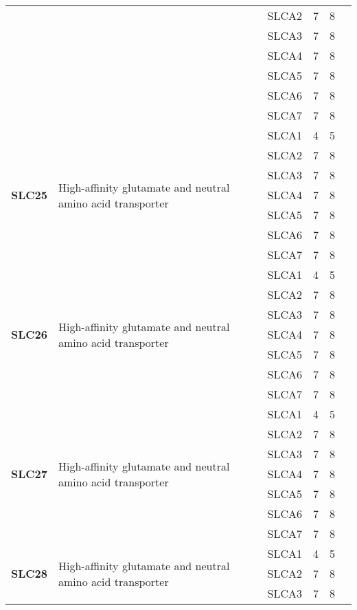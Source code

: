 \documentclass[12pt]{report}
\begin{document}
\begin{center}
\begin{longtable}{|p{1.5cm}|p{3.2cm}|p{1.9cm}|p{1.65cm}|p{3cm}|p{3cm}|}
\cline{3-6}
&&SLCA2&7 & 8&\\ 
\cline{3-6}
&&SLCA3&7 & 8&\\ 
\cline{3-6}
&&SLCA4&7 & 8&\\ 
\cline{3-6}
&&SLCA5&7 & 8&\\ 
\cline{3-6}
&&SLCA6&7 & 8&\\ 
\cline{3-6}
&&SLCA7&7 & 8&\\ 
\hline
\multirow{7}{1.5cm}{\textbf{SLC25}} & \multirow{7}{4cm}{High-affinity glutamate and neutral amino acid transporter} & SLCA1 & 4 & 5\\ 
\cline{3-6}
&&SLCA2&7 & 8&\\ 
\cline{3-6}
&&SLCA3&7 & 8&\\ 
\cline{3-6}
&&SLCA4&7 & 8&\\ 
\cline{3-6}
&&SLCA5&7 & 8&\\ 
\cline{3-6}
&&SLCA6&7 & 8&\\ 
\cline{3-6}
&&SLCA7&7 & 8&\\ 
\hline
\multirow{7}{1.5cm}{\textbf{SLC26}} & \multirow{7}{4cm}{High-affinity glutamate and neutral amino acid transporter} & SLCA1 & 4 & 5\\ 
\cline{3-6}
&&SLCA2&7 & 8&\\ 
\cline{3-6}
&&SLCA3&7 & 8&\\ 
\cline{3-6}
&&SLCA4&7 & 8&\\ 
\cline{3-6}
&&SLCA5&7 & 8&\\ 
\cline{3-6}
&&SLCA6&7 & 8&\\ 
\cline{3-6}
&&SLCA7&7 & 8&\\ 
\hline
\multirow{7}{1.5cm}{\textbf{SLC27}} & \multirow{7}{4cm}{High-affinity glutamate and neutral amino acid transporter} & SLCA1 & 4 & 5\\ 
\cline{3-6}
&&SLCA2&7 & 8&\\ 
\cline{3-6}
&&SLCA3&7 & 8&\\ 
\cline{3-6}
&&SLCA4&7 & 8&\\ 
\cline{3-6}
&&SLCA5&7 & 8&\\ 
\cline{3-6}
&&SLCA6&7 & 8&\\ 
\cline{3-6}
&&SLCA7&7 & 8&\\ 
\hline
\multirow{7}{1.5cm}{\textbf{SLC28}} & \multirow{7}{4cm}{High-affinity glutamate and neutral amino acid transporter} & SLCA1 & 4 & 5\\ 
\cline{3-6}
&&SLCA2&7 & 8&\\ 
\cline{3-6}
&&SLCA3&7 & 8&\\ 

\end{longtable}
\end{center}
\end{document}
